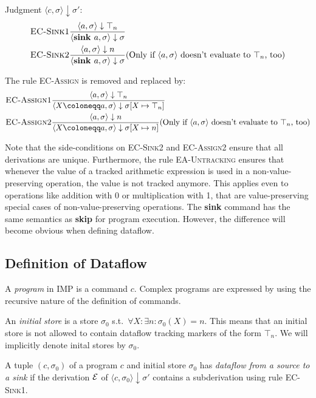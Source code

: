 Judgment $\langle c, \sigma \rangle \downarrow \sigma'$:
\begin{align*}
    &\textsc{EC-Sink1}\frac{\displaystyle \langle a, \sigma \rangle\downarrow \top_n}{\displaystyle \langle \textbf{sink } a, \sigma \rangle \downarrow \sigma}\\
    &\textsc{EC-Sink2}\frac{\displaystyle \langle a, \sigma\rangle \downarrow n}{\displaystyle \langle \textbf{sink } a, \sigma \rangle \downarrow \sigma}
    (\text{Only if $\langle a, \sigma\rangle$ doesn't evaluate to $\top_n$, too})
\end{align*}

The rule \textsc{EC-Assign} is removed and replaced by:
\begin{align*}
    &\textsc{EC-Assign1}\ddfrac{\langle a, \sigma\rangle \downarrow \top_n}
    {\langle X \coloneqq a, \sigma \rangle \downarrow \sigma[X \mapsto \top_n]}\\
    &\textsc{EC-Assign2}\ddfrac{\langle a, \sigma \rangle \downarrow n}
    {\langle X \coloneqq a, \sigma \rangle \downarrow \sigma[X \mapsto n]}
     (\text{Only if $\langle a, \sigma\rangle$ doesn't evaluate to $\top_n$, too})
\end{align*}

Note that the side-conditions on \textsc{EC-Sink2} and \textsc{EC-Assign2}
ensure that all derivations are unique.
Furthermore, the rule \textsc{EA-Untracking} ensures that whenever the value of
a tracked arithmetic expression is used in a non-value-preserving operation,
the value is not tracked anymore.
This applies even to operations like addition with 0 or multiplication with 1,
that are value-preserving special cases of non-value-preserving operations.
The \textbf{sink} command has the same semantics as \textbf{skip} 
for program execution.
However, the difference will become obvious when defining dataflow.

\subsection{Definition of Dataflow}
A \emph{program} in IMP is a command $c$.
Complex programs are expressed by using the recursive nature of
the definition of commands.

An \emph{initial store} is a store $\sigma_0$ s.t.\ 
$\forall X: \exists n: \sigma_0(X) = n$.
This means that an initial store is not allowed to contain dataflow tracking 
markers of the form $\top_n$.
We will implicitly denote inital stores by $\sigma_0$.

A tuple $(c, \sigma_0)$ of a program $c$ and initial store $\sigma_0$ 
has \emph{dataflow from a source to a sink} if the derivation $\operatorname{\mathcal{E}}$
of $\langle c, \sigma_0 \rangle \downarrow \sigma'$ contains a 
subderivation using rule \textsc{EC-Sink1}.

